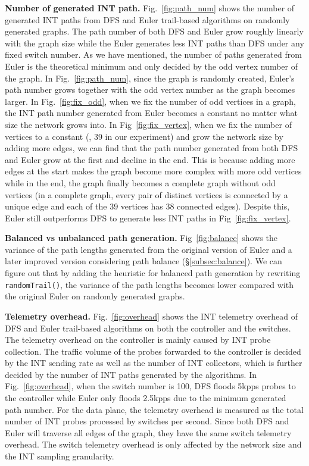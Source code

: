 \textbf{Number of generated INT path.}
Fig.~\ref{fig:path_num} shows the number of generated INT paths from DFS and Euler trail-based algorithms on randomly generated graphs. The path number of both DFS and Euler grow roughly linearly with the graph size while the Euler generates less INT paths than DFS under any fixed switch number. As we have mentioned, the number of paths generated from Euler is the theoretical minimum and only decided by the odd vertex number of the graph. In Fig.~\ref{fig:path_num}, since the graph is randomly created, Euler's path number grows together with the odd vertex number as the graph becomes larger. In Fig.~\ref{fig:fix_odd}, when we fix the number of odd vertices in a graph, the INT path number generated from Euler becomes a constant no matter what size the network grows into. In Fig~\ref{fig:fix_vertex}, when we fix the number of vertices to a constant (\eg, 39 in our experiment) and grow the network size by adding more edges, we can find that the path number generated from both DFS and Euler grow at the first and decline in the end. This is because adding more edges at the start makes the graph become more complex with more odd vertices while in the end, the graph finally becomes a complete graph without odd vertices (in a complete graph, every pair of distinct vertices is connected by a unique edge and each of the 39 vertices has 38 connected edges). Despite this, Euler still outperforms DFS to generate less INT paths in Fig~\ref{fig:fix_vertex}.

\textbf{Balanced vs unbalanced path generation.}
Fig~\ref{fig:balance} shows the variance of the path lengths generated from the original version of Euler and a later improved version considering path balance (\S\ref{subsec:balance}). We can figure out that by adding the heuristic for balanced path generation by rewriting \texttt{randomTrail()}, the variance of the path lengths becomes lower compared with the original Euler on randomly generated graphs.



\textbf{Telemetry overhead.}
Fig.~\ref{fig:overhead} shows the INT telemetry overhead of DFS and Euler trail-based algorithms on both the controller and the switches. The telemetry overhead on the controller is mainly caused by INT probe collection. The traffic volume of the probes forwarded to the controller is decided by the INT sending rate as well as the number of INT collectors, which is further decided by the number of INT paths generated by the algorithms. In Fig.~\ref{fig:overhead}, when the switch number is 100, DFS floods 5kpps probes to the controller while Euler only floods 2.5kpps due to the minimum generated path number. For the data plane, the telemetry overhead is measured as the total number of INT probes processed by switches per second. Since both DFS and Euler will traverse all edges of the graph, they have the same switch telemetry overhead. The switch telemetry overhead is only affected by the network size and the INT sampling granularity.

